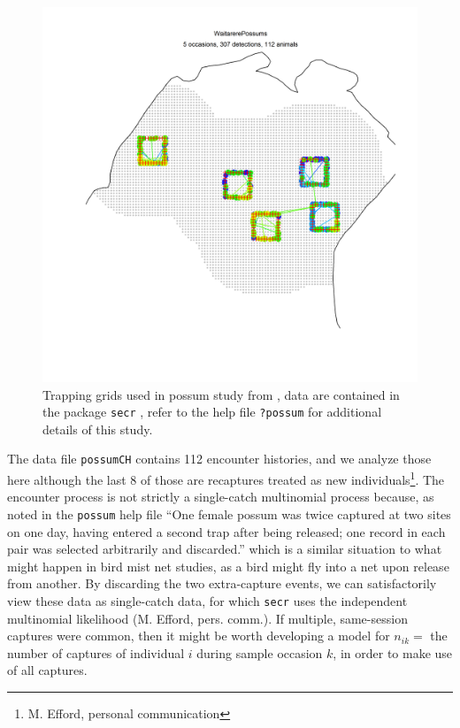 \begin{figure}
\centering
\includegraphics[width=5in]{Ch9-PoisMn/figs/possum.png}
\caption{Trapping grids used in possum study from
  \citet{efford_etal:2005}, data are contained in the \R
package \mbox{\tt secr}
\citep{efford:2011}, refer to the help file \mbox{\tt ?possum} for
additional details of this study.}
\label{poisson-mn.fig.possum}
\end{figure}

The data file \mbox{\tt possumCH} contains 112 encounter histories,
and we analyze those here although the last 8 of those are recaptures
treated as new individuals\footnote{M. Efford, personal communication}.
The encounter process is not strictly a single-catch multinomial process because,
as noted in the \mbox{\tt possum} help file
 ``One female possum was twice captured at two
sites on one day, having entered a second trap after being released;
one record in each pair was selected arbitrarily and discarded.''
which is a similar situation to what might happen in bird mist net
studies, as a bird might fly into a net upon release from another.
By discarding the two
extra-capture events, we can satisfactorily view these data as
single-catch data, for which \mbox{\tt secr} uses the independent
multinomial likelihood (M. Efford, pers. comm.).
If multiple, same-session captures 
were common, then it might be worth developing a 
model for $n_{ik} = $ the number of captures of individual $i$ during
sample occasion $k$, in order to make use of all captures. 

